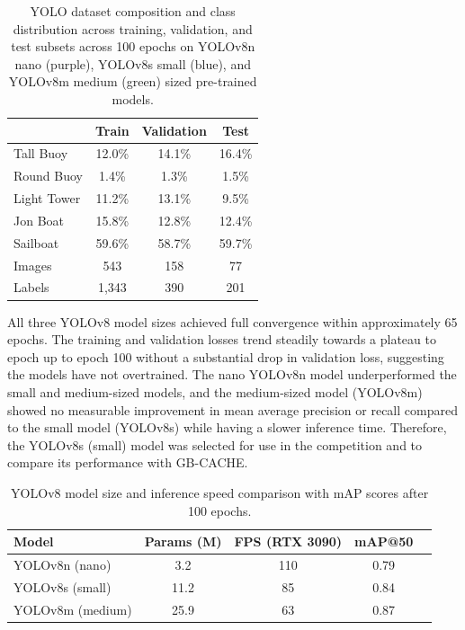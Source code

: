 \documentclass{erauthesis}
\begin{document}
\begin{table}[htbp]
\centering
\begin{tabular}{lccc}
\hline
& Train & Validation & Test  \\
\hline

Tall Buoy & 12.0\% & 14.1\% & 16.4\%   \\
Round Buoy & 1.4\% & 1.3\% & 1.5\%  \\
Light Tower & 11.2\% & 13.1\% & 9.5\%   \\
Jon Boat & 15.8\% & 12.8\% & 12.4\%   \\
Sailboat & 59.6\% & 58.7\% & 59.7\%   \\
\hline
Images & 543 & 158 & 77  \\
Labels & 1,343 & 390 & 201  \\
\hline
\end{tabular}
\caption{YOLO dataset composition and class distribution across training, validation, and test subsets across 100 epochs on YOLOv8n nano (purple), YOLOv8s small (blue), and YOLOv8m medium (green) sized pre-trained models.}
\label{table:yolo_data_split}
\end{table}




All three YOLOv8 model sizes achieved full convergence within approximately 65 epochs. 
The training and validation losses trend steadily towards a plateau to epoch up to epoch 100 without a substantial drop in validation loss, suggesting the models have not overtrained. The nano YOLOv8n model underperformed the small and medium-sized models, and the medium-sized model (YOLOv8m) showed no measurable improvement in mean average precision or recall compared to the small model (YOLOv8s) while having a slower inference time.
Therefore, the YOLOv8s (small) model was selected for use in the competition and to compare its performance with GB-CACHE.

\begin{table}[htbp]
\centering
\begin{tabular}{l c c c c}
\hline
Model & Params (M) & FPS (RTX 3090) & mAP@50 \\
\hline
YOLOv8n (nano) & 3.2 &  110 & 0.79 \\
YOLOv8s (small) & 11.2 &  85 & 0.84 \\
YOLOv8m (medium) & 25.9 &  63 & 0.87 \\
\hline
\end{tabular}
\caption{YOLOv8 model size and inference speed comparison with mAP scores after 100 epochs.}
\label{tab:yolo_variants}
\end{table}
\end{document}
